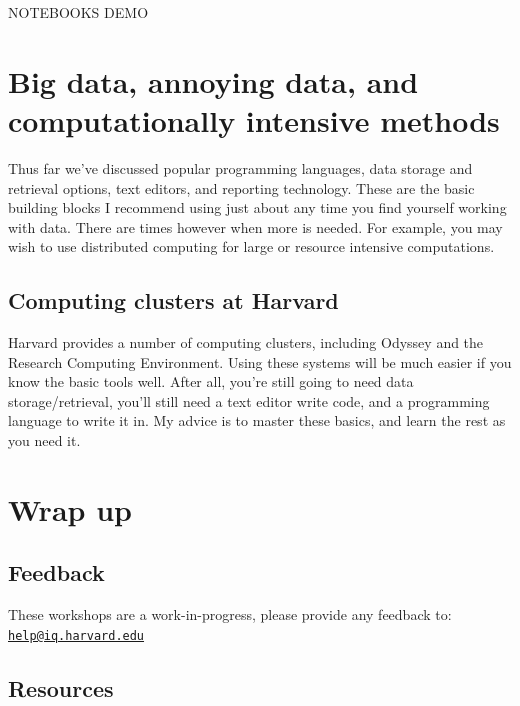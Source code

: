 \documentclass[]{book}
\begin{document}
NOTEBOOKS DEMO

\section{Big data, annoying data, and computationally intensive
methods}\label{big-data-annoying-data-and-computationally-intensive-methods}

Thus far we've discussed popular programming languages, data storage and
retrieval options, text editors, and reporting technology. These are the
basic building blocks I recommend using just about any time you find
yourself working with data. There are times however when more is needed.
For example, you may wish to use distributed computing for large or
resource intensive computations.

\subsection{Computing clusters at
Harvard}\label{computing-clusters-at-harvard}

Harvard provides a number of computing clusters, including Odyssey and
the Research Computing Environment. Using these systems will be much
easier if you know the basic tools well. After all, you're still going
to need data storage/retrieval, you'll still need a text editor write
code, and a programming language to write it in. My advice is to master
these basics, and learn the rest as you need it.

\section{Wrap up}\label{wrap-up}

\subsection{Feedback}\label{feedback}

These workshops are a work-in-progress, please provide any feedback to:
\href{mailto:help@iq.harvard.edu}{\nolinkurl{help@iq.harvard.edu}}

\subsection{Resources}\label{resources}
\end{document}
